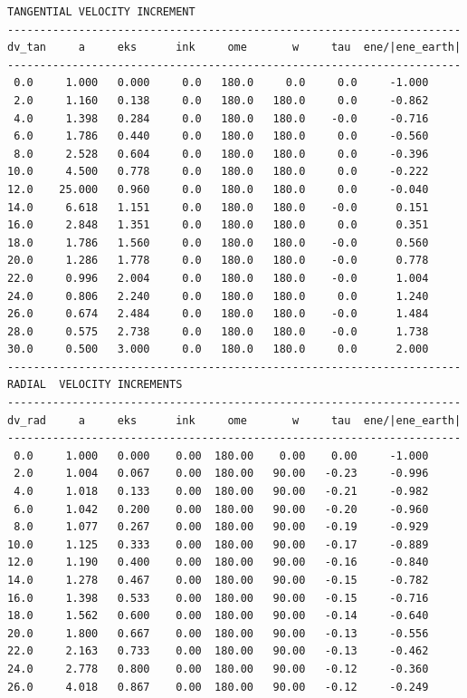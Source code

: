 \documentclass[a4paper,12pt]{article}
\def\red{\color{red}}
\begin{document}
{{{{\red \scriptsize
\begin{verbatim}  
TANGENTIAL VELOCITY INCREMENT
----------------------------------------------------------------------
dv_tan     a     eks      ink     ome       w     tau  ene/|ene_earth|
----------------------------------------------------------------------
 0.0     1.000   0.000     0.0   180.0     0.0     0.0     -1.000
 2.0     1.160   0.138     0.0   180.0   180.0     0.0     -0.862
 4.0     1.398   0.284     0.0   180.0   180.0    -0.0     -0.716
 6.0     1.786   0.440     0.0   180.0   180.0     0.0     -0.560
 8.0     2.528   0.604     0.0   180.0   180.0     0.0     -0.396
10.0     4.500   0.778     0.0   180.0   180.0     0.0     -0.222
12.0    25.000   0.960     0.0   180.0   180.0     0.0     -0.040
14.0     6.618   1.151     0.0   180.0   180.0    -0.0      0.151
16.0     2.848   1.351     0.0   180.0   180.0     0.0      0.351
18.0     1.786   1.560     0.0   180.0   180.0    -0.0      0.560
20.0     1.286   1.778     0.0   180.0   180.0    -0.0      0.778
22.0     0.996   2.004     0.0   180.0   180.0    -0.0      1.004
24.0     0.806   2.240     0.0   180.0   180.0     0.0      1.240
26.0     0.674   2.484     0.0   180.0   180.0    -0.0      1.484
28.0     0.575   2.738     0.0   180.0   180.0    -0.0      1.738
30.0     0.500   3.000     0.0   180.0   180.0     0.0      2.000
----------------------------------------------------------------------
RADIAL  VELOCITY INCREMENTS
----------------------------------------------------------------------
dv_rad     a     eks      ink     ome       w     tau  ene/|ene_earth|
----------------------------------------------------------------------
 0.0     1.000   0.000    0.00  180.00    0.00    0.00     -1.000
 2.0     1.004   0.067    0.00  180.00   90.00   -0.23     -0.996
 4.0     1.018   0.133    0.00  180.00   90.00   -0.21     -0.982
 6.0     1.042   0.200    0.00  180.00   90.00   -0.20     -0.960
 8.0     1.077   0.267    0.00  180.00   90.00   -0.19     -0.929
10.0     1.125   0.333    0.00  180.00   90.00   -0.17     -0.889
12.0     1.190   0.400    0.00  180.00   90.00   -0.16     -0.840
14.0     1.278   0.467    0.00  180.00   90.00   -0.15     -0.782
16.0     1.398   0.533    0.00  180.00   90.00   -0.15     -0.716
18.0     1.562   0.600    0.00  180.00   90.00   -0.14     -0.640
20.0     1.800   0.667    0.00  180.00   90.00   -0.13     -0.556
22.0     2.163   0.733    0.00  180.00   90.00   -0.13     -0.462
24.0     2.778   0.800    0.00  180.00   90.00   -0.12     -0.360
26.0     4.018   0.867    0.00  180.00   90.00   -0.12     -0.249

\end{verbatim}}}}}
\end{document}
